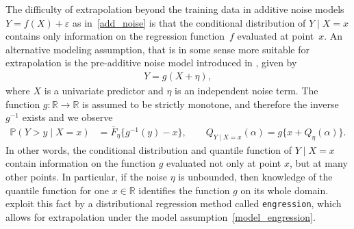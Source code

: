 \documentclass{statsoc}
\theoremstyle{break}
\newcommand{\eps}{\varepsilon}
\renewcommand{\P}{\mathbb P}
\begin{document}
The difficulty of extrapolation beyond the training data in additive noise models $Y = f(X) + \eps$ as in~\eqref{add_noise} is that the conditional distribution of $Y\mid X=x$ contains only information on the regression function~$f$ evaluated at point~$x$.
An alternative modeling assumption, that is in some sense more suitable for extrapolation is the pre-additive noise model introduced in \citep{shen:meinshausen:2023}, given by
\begin{align}\label{model_engression}
	Y = g(X + \eta),
\end{align} 
where $X$ is a univariate predictor and $\eta$ is an independent noise term. The function $g:\mathbb R\to\mathbb R$ is assumed to be strictly monotone, and therefore the inverse~$g^{-1}$ exists and we observe 
\begin{align}\label{engression_structure}
	\P(Y > y \mid X = x) &=  \bar F_\eta\{g^{-1}(y) - x\}, \qquad 	Q_{Y\mid X = x}(\alpha) = g\{x + Q_\eta(\alpha)\}.
\end{align} 
In other words, the conditional distribution and quantile function of $Y \mid X=x$ contain information on the function $g$ evaluated not only at point $x$, but at many other points. In particular, if the noise $\eta$ is unbounded, then knowledge of the quantile function for one $x\in \mathbb R$ identifies the function $g$ on its whole domain. \cite{shen:meinshausen:2023} exploit this fact by a distributional regression method called \texttt{engression}, which allows for extrapolation under the model assumption~\eqref{model_engression}.
\end{document}
